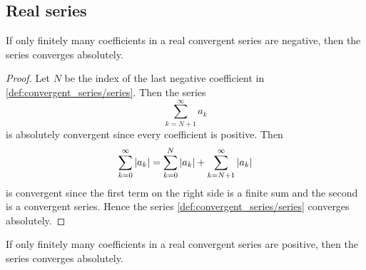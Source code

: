 \subsection{Real series}\label{subsec:real_series}

\begin{proposition}\label{thm:almost_all_terms_positive_implies_absolute_convergent}
  If only finitely many coefficients in a real convergent series are negative, then the series converges absolutely.
\end{proposition}
\begin{proof}
  Let \( N \) be the index of the last negative coefficient in \cref{def:convergent_series/series}. Then the series
  \begin{equation*}
    \sum_{k={N+1}}^\infty a_k
  \end{equation*}
  is absolutely convergent since every coefficient is positive. Then
  \begin{equation*}
    \sum_{k=0}^\infty \left\vert a_k \right\vert = \sum_{k=0}^N \left\vert a_k \right\vert + \sum_{k=N+1}^\infty \left\vert a_k \right\vert
  \end{equation*}
  is convergent since the first term on the right side is a finite sum and the second is a convergent series. Hence the series \cref{def:convergent_series/series} converges absolutely.
\end{proof}

\begin{corollary}\label{thm:almost_all_terms_negative_implies_absolute_convergent}
  If only finitely many coefficients in a real convergent series are positive, then the series converges absolutely.
\end{corollary}

